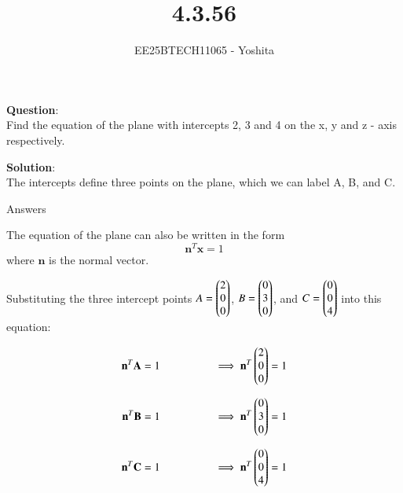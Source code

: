 \documentclass[journal]{IEEEtran}
\begin{document}

\vspace{3cm}

\title{4.3.56}
\author{EE25BTECH11065 - Yoshita}
{\let\newpage\relax\maketitle}

\renewcommand{\thefigure}{\theenumi}
\renewcommand{\thetable}{\theenumi}
\setlength{\intextsep}{10pt} %

\textbf{Question}:\\
Find the equation of the plane with intercepts 2, 3 and 4 on the x, y and z - axis respectively.\\
\bigskip

\textbf{Solution}:\\
The intercepts define three points on the plane, which we can label A, B, and C.
\begin{table}[H]    
  \centering
  
  \caption{Answers}
  \label{Answers}
\end{table}
The equation of the plane can also be written in the form
\[
\mathbf{n}^T \mathbf{x} = 1
\]
  where $\mathbf{n}$ is the normal vector.

Substituting the three intercept points $A = \begin{pmatrix}2\\0\\0\end{pmatrix}$, 
$B = \begin{pmatrix}0\\3\\0\end{pmatrix}$, and $C = \begin{pmatrix}0\\0\\4\end{pmatrix}$ into this equation:

\begin{align}
\mathbf{n}^T \mathbf{A} &= 1 
\;\;\;\;\;\;\;\;\;\;\;\;\;\;\;\;\;
\implies \mathbf{n}^T \begin{pmatrix}2\\0\\0\end{pmatrix} = 1 \\[6pt]
\mathbf{n}^T \mathbf{B} &= 1 
\;\;\;\;\;\;\;\;\;\;\;\;\;\;\;\;\;
\implies \mathbf{n}^T \begin{pmatrix}0\\3\\0\end{pmatrix} = 1 \\[6pt]
\mathbf{n}^T \mathbf{C} &= 1 
\;\;\;\;\;\;\;\;\;\;\;\;\;\;\;\;\;
\implies \mathbf{n}^T \begin{pmatrix}0\\0\\4\end{pmatrix} = 1
\end{align}
\end{document}
